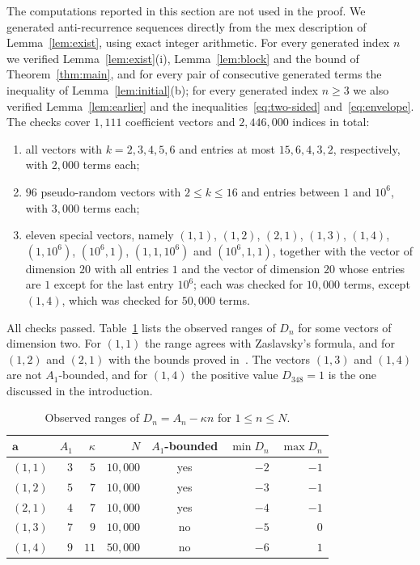 \documentclass{amsart}
\theoremstyle{definition}
\theoremstyle{remark}
\numberwithin{equation}{section}
\numberwithin{table}{section}
\newcommand{\ba}{\mathbf{a}}
\begin{document}
The computations reported in this section are not used in the proof. We generated anti-recurrence sequences directly from the mex description of Lemma~\ref{lem:exist}, using exact integer arithmetic. For every generated index $n$ we verified Lemma~\ref{lem:exist}(i), Lemma~\ref{lem:block} and the bound of Theorem~\ref{thm:main}, and for every pair of consecutive generated terms the inequality of Lemma~\ref{lem:initial}(b); for every generated index $n\ge3$ we also verified Lemma~\ref{lem:earlier} and the inequalities~\eqref{eq:two-sided} and~\eqref{eq:envelope}. The checks cover $1{,}111$ coefficient vectors and $2{,}446{,}000$ indices in total:
\begin{enumerate}
\item[(1)] all vectors with $k=2,3,4,5,6$ and entries at most $15,6,4,3,2$, respectively, with $2{,}000$ terms each;
\item[(2)] $96$ pseudo-random vectors with $2\le k\le16$ and entries between $1$ and $10^6$, with $3{,}000$ terms each;
\item[(3)] eleven special vectors, namely $(1,1)$, $(1,2)$, $(2,1)$, $(1,3)$, $(1,4)$, $(1,10^6)$, $(10^6,1)$, $(1,1,10^6)$ and $(10^6,1,1)$, together with the vector of dimension $20$ with all entries $1$ and the vector of dimension $20$ whose entries are $1$ except for the last entry $10^6$; each was checked for $10{,}000$ terms, except $(1,4)$, which was checked for $50{,}000$ terms.
\end{enumerate}
All checks passed. Table~\ref{tab:ranges} lists the observed ranges of $D_n$ for some vectors of dimension two. For $(1,1)$ the range agrees with Zaslavsky's formula, and for $(1,2)$ and $(2,1)$ with the bounds proved in~\cite[Theorems~1 and~2]{FJ}. The vectors $(1,3)$ and $(1,4)$ are not $A_1$-bounded, and for $(1,4)$ the positive value $D_{348}=1$ is the one discussed in the introduction.

\begin{table}[ht]
\caption{Observed ranges of $D_n=A_n-\kappa n$ for $1\le n\le N$.}\label{tab:ranges}
\begin{tabular}{lrrrcrr}
\toprule
$\ba$ & $A_1$ & $\kappa$ & $N$ & $A_1$-bounded & $\min D_n$ & $\max D_n$\\
\midrule
$(1,1)$ & $3$ & $5$ & $10{,}000$ & yes & $-2$ & $-1$\\
$(1,2)$ & $5$ & $7$ & $10{,}000$ & yes & $-3$ & $-1$\\
$(2,1)$ & $4$ & $7$ & $10{,}000$ & yes & $-4$ & $-1$\\
$(1,3)$ & $7$ & $9$ & $10{,}000$ & no & $-5$ & $0$\\
$(1,4)$ & $9$ & $11$ & $50{,}000$ & no & $-6$ & $1$\\
\bottomrule
\end{tabular}
\end{table}
\end{document}
